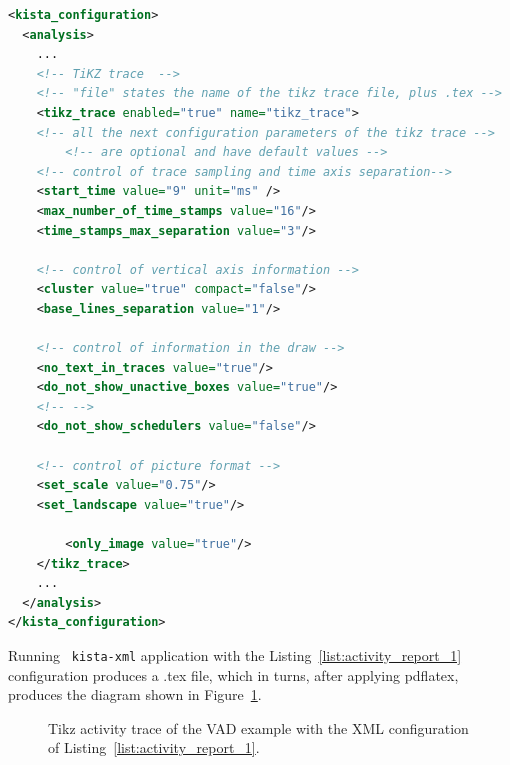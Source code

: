 \begin{table}[htbp]
\begin{lstlisting}[language=XML, caption={Example of configuration of an activity report from the XML interface for the VAD example.}, label=list:activity_report_1]
<kista_configuration>
  <analysis>
    ...
    <!-- TiKZ trace  -->
    <!-- "file" states the name of the tikz trace file, plus .tex -->
    <tikz_trace enabled="true" name="tikz_trace">
	<!-- all the next configuration parameters of the tikz trace -->
        <!-- are optional and have default values -->
	<!-- control of trace sampling and time axis separation-->
	<start_time value="9" unit="ms" />
	<max_number_of_time_stamps value="16"/>
	<time_stamps_max_separation value="3"/>

	<!-- control of vertical axis information -->
	<cluster value="true" compact="false"/>
	<base_lines_separation value="1"/>

	<!-- control of information in the draw -->
	<no_text_in_traces value="true"/>
	<do_not_show_unactive_boxes value="true"/>	
	<!-- -->
	<do_not_show_schedulers value="false"/>	
			
	<!-- control of picture format -->
	<set_scale value="0.75"/>
	<set_landscape value="true"/>
			
        <only_image value="true"/>
    </tikz_trace>
    ...
  </analysis>
</kista_configuration>
\end{lstlisting}
\end{table}

Running \texttt{ kista-xml} application with the Listing~\ref{list:activity_report_1} configuration produces
a .tex file, which in turns, after applying pdflatex, produces the diagram shown in Figure~\ref{fig:tikz_trace_only_img1}.


\begin{figure}[htbp]
\centering
\caption{Tikz activity trace of the VAD example with the XML configuration of Listing~\ref{list:activity_report_1}.} 
\label{fig:tikz_trace_only_img1}
\end{figure}

